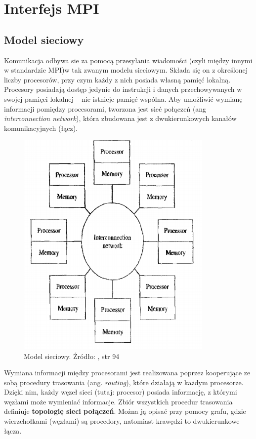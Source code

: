 \section{Interfejs MPI}

\subsection{Model sieciowy}

Komunikacja odbywa sie za pomocą przesyłania wiadomości (czyli między innymi w standardzie MPI)w tak zwanym modelu sieciowym. Składa się on z określonej liczby procesorów, przy czym każdy z nich posiada własną pamięć lokalną. Procesory posiadają dostęp jedynie do instrukcji i danych przechowywanych w swojej pamięci lokalnej -- nie istnieje pamięć wspólna. Aby umożliwić wymianę informacji pomiędzy procesorami, tworzona jest sieć połączeń (ang \textit{interconnection network}), która zbudowana jest z dwukierunkowych kanałów komunikacyjnych (łącz). 

\begin{figure}[h]
	\centering
	\includegraphics[width=0.85\textwidth]{./img/sieciowy.png}
	\caption{Model sieciowy. Źródło: \cite{Parallel}, str 94}
	\label{img:sieć}
\end{figure}

Wymiana informacji między procesorami jest realizowana poprzez kooperujące ze sobą procedury trasowania (ang. \textit{routing}), które działają w każdym procesorze. Dzięki nim, każdy węzeł sieci (tutaj: procesor) posiada informację, z którymi węzłami może wymieniać informacje. Zbiór wszystkich procedur trasowania definiuje \textbf{topologię sieci połączeń}. Można ją opisać przy pomocy grafu, gdzie wierzchołkami (węzłami) są procedory, natomiast krawędzi to dwukierunkowe łącza.

